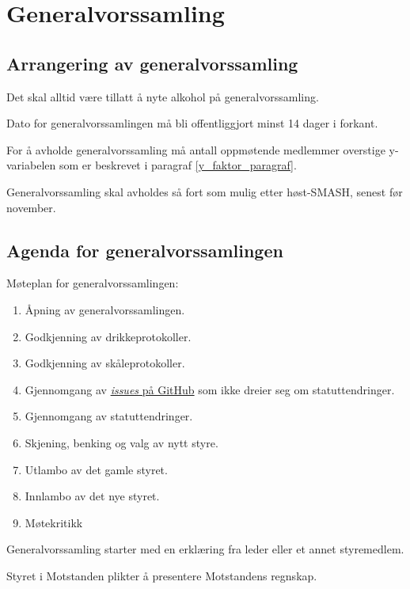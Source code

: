   
\section{Generalvorssamling}
    \subsection{Arrangering av generalvorssamling}
        \begin{statute}
            Det skal alltid være tillatt å nyte alkohol på generalvorssamling.
        \end{statute}
        \begin{statute}
            Dato for generalvorssamlingen må bli offentliggjort minst 14 dager i forkant.
        \end{statute}
        \begin{statute} 
            For å avholde generalvorssamling må antall oppmøtende medlemmer overstige y-variabelen som er beskrevet i paragraf \ref{y_faktor_paragraf}.
        \end{statute}
        \begin{statute}
            Generalvorssamling skal avholdes så fort som mulig etter høst-SMASH, senest før november.
        \end{statute}
    
    \subsection{Agenda for generalvorssamlingen}
        \begin{statute}
            Møteplan for generalvorssamlingen:
            \begin{enumerate}
                \item Åpning av generalvorssamlingen.
                \item Godkjenning av drikkeprotokoller.
                \item Godkjenning av skåleprotokoller.
                \item Gjennomgang av \href{https://github.com/Motstanden/motstanden-statutter/issues}{\textit{issues} på GitHub} som ikke dreier seg om statuttendringer.
                \item Gjennomgang av statuttendringer.
                \item Skjening, benking og valg av nytt styre.
                \item Utlambo av det gamle styret.
                \item Innlambo av det nye styret.
                \item Møtekritikk
            \end{enumerate}
        \end{statute}
        \begin{statute}
            Generalvorssamling starter med en erklæring fra leder eller et annet styremedlem.
        \end{statute}
        \begin{statute}
            Styret i Motstanden plikter å presentere Motstandens regnskap. 
        \end{statute}

